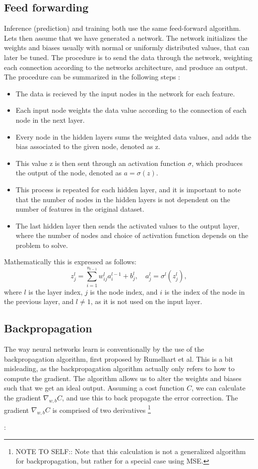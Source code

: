 \subsection*{Feed forwarding}
Inference (prediction) and training both use the same feed-forward algorithm. Lets then assume that we have generated a network. The network initializes the weights and biases usually 
with normal or uniformly distributed values, that can later be tuned. The procedure is to send the data through the network, weighting each connection according to the networks architecture,
and produce an output. The procedure can be summarized in the following steps \cite{FYSSTK}:
 \begin{itemize}
    \item The data is recieved by the input nodes in the network for each feature.
    \item Each input node weights the data value according to the connection of each node in the next layer.
    \item Every node in the hidden layers sums the weighted data values, and adds the bias associated to the given node, denoted as z. 
    \item This value z is then sent through an activation function $\sigma$, which produces the output of the node, denoted as $a = \sigma(z)$.
    \item This process is repeated for each hidden layer, and it is important to note that the number of nodes in the hidden layers is not dependent on the number of features in the original dataset. 
    \item The last hidden layer then sends the activated values to the output layer, where the number of nodes and choice of activation function depends on the problem to solve.
 \end{itemize}

Mathematically this is expressed as follows:
\begin{equation}
    z_j^l = \sum_{i=1}^{n_{l-1}} w_{ij}^l a_i^{l-1} + b_j^l, \quad a_j^l = \sigma^l(z_j^l),
\end{equation}
where $l$ is the layer index, $j$ is the node index, and $i$ is the index of the node in the previous layer, and $l \neq 1$, as it is not used on the input layer.


\subsection*{Backpropagation}
The way neural networks learn is conventionally by the use of the backpropagation algorithm, first proposed by Rumelhart et al\cite{backprop}. This is a bit misleading, 
as the backpropagation algorithm actually only refers to how to compute the gradient\cite{Goodfellow-et-al-2016}. The algorithm allows us to alter the weights and biases such that
we get an ideal output. Assuming a cost function $C$, we can calculate the gradient $\nabla_{w, b}C$, and use this to back propagate the error correction. The gradient $\nabla_{w, b}C$ is comprised of 
two derivatives
\footnote{NOTE TO SELF:: Note that this calculation is not a generalized algorithm for backpropagation, but rather for a special case using MSE.}\par
:\par 

